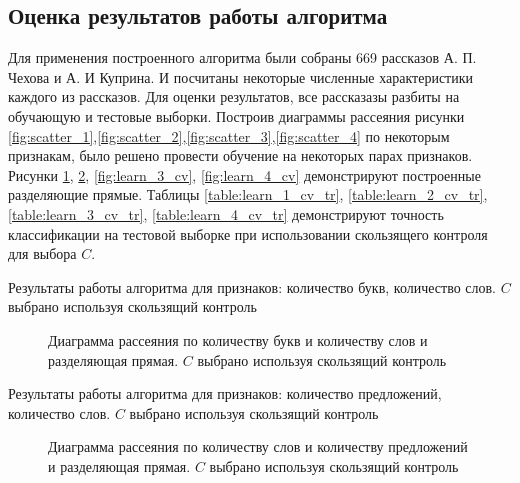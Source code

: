 \documentclass[%
bachelor,    %
subf,        %
href,        %
colorlinks,  %
]{disser}
\begin{document}
\subsection{Оценка результатов работы алгоритма}
Для применения построенного алгоритма были собраны 669 рассказов А. П. Чехова и А. И Куприна. И посчитаны некоторые численные характеристики каждого из рассказов.
Для оценки результатов, все рассказазы разбиты на обучающую и тестовые выборки.
Построив диаграммы рассеяния рисунки \ref{fig:scatter_1},\ref{fig:scatter_2},\ref{fig:scatter_3},\ref{fig:scatter_4} по некоторым признакам, было решено провести обучение на некоторых парах признаков.
Рисунки \ref{fig:learn_1_cv}, \ref{fig:learn_2_cv}, \ref{fig:learn_3_cv}, \ref{fig:learn_4_cv} демонстрируют построенные разделяющие прямые. 
Таблицы \ref{table:learn_1_cv_tr}, \ref{table:learn_2_cv_tr}, \ref{table:learn_3_cv_tr},  \ref{table:learn_4_cv_tr} демонстрируют точность классификации на тестовой выборке при использовании скользящего контроля для выбора $C$.
\newpage
\begin{center}
	\begin{table}[h!]{}
		\centering	
		\caption{Результаты работы алгоритма для признаков: количество букв, количество слов. $C$ выбрано используя скользящий контроль}
		
		\label{table:learn_1_cv_tr}
	\end{table}
	\begin{figure}[t!]
		\centering		
		
		\caption{Диаграмма рассеяния по количеству букв и количеству слов и разделяющая прямая. $C$ выбрано используя скользящий контроль}
		\label{fig:learn_1_cv}
	\end{figure}
\end{center}
\newpage
\begin{center}
\begin{table}{}
	\centering
	\caption{Результаты работы алгоритма для признаков: количество предложений, количество слов. $C$ выбрано используя скользящий контроль}	
	
	\label{table:learn_2_cv_tr}
\end{table}	
\begin{figure}[t!]
	\centering		
	
	\caption{Диаграмма рассеяния по количеству слов и количеству предложений и разделяющая прямая. $C$ выбрано используя скользящий контроль}
	\label{fig:learn_2_cv}
\end{figure}
\end{center}
\end{document}
